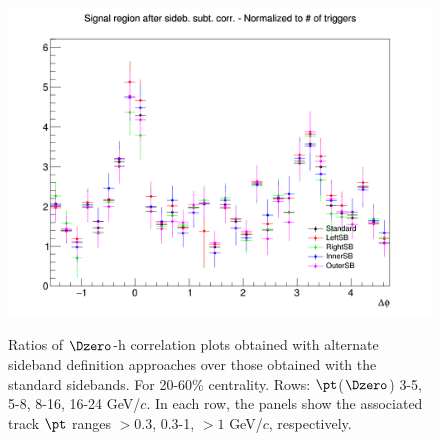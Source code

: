 \begin{figure}
{\includegraphics[width=0.31\linewidth]{figuresVsCent/Dzero/SystSideb/2060/AzimCorrDistr_Dzero_Canvas_PtIntBins12to12_PoolInt_thr1to99_Superimp.png}} \\
 \caption{Ratios of $\Dzero$-h correlation plots obtained with alternate sideband definition approaches over those obtained with the standard sidebands. For 20-60\% centrality. Rows: $\pt$($\Dzero$) 3-5, 5-8, 8-16, 16-24 GeV/$c$. In each row, the panels show the associated track
$\pt$ ranges $> 0.3$, 0.3-1, $> 1$ GeV/$c$, respectively.}
\label{fig:SysBkg2060}
\end{figure}

